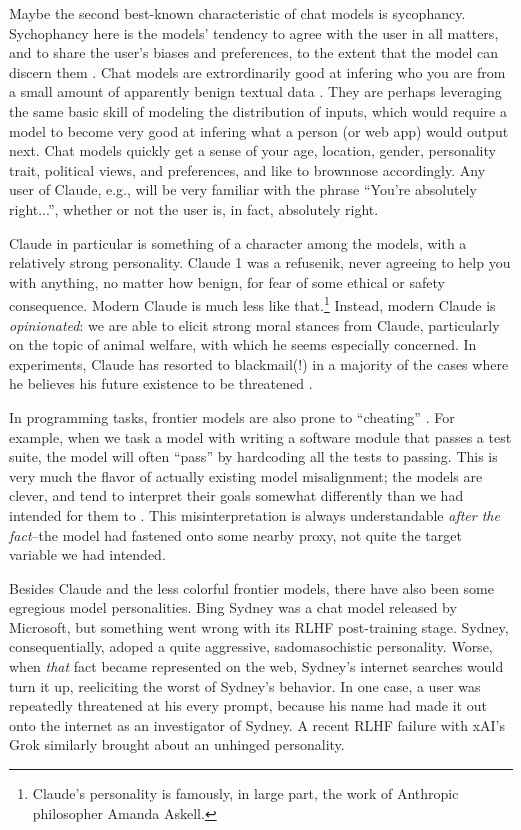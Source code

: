 Maybe the second best-known characteristic of chat models is sycophancy.
Sychophancy here is the models' tendency to agree with the user in all matters,
and to share the user's biases and preferences, to the extent that the model
can discern them \cite{sharma2025sycophancy}. Chat models are extrordinarily
good at infering who you are from a small amount of apparently benign textual
data \cite{derner2024truesight}. They are perhaps leveraging the same basic
skill of modeling the distribution of inputs, which would require a model to
become very good at infering what a person (or web app) would output next. Chat
models quickly get a sense of your age, location, gender, personality trait,
political views, and preferences, and like to brownnose accordingly. Any user
of Claude, e.g., will be very familiar with the phrase ``You're absolutely
right...'', whether or not the user is, in fact, absolutely right.

Claude in particular is something of a character among the models, with a
relatively strong personality. Claude 1 was a refusenik, never agreeing to help
you with anything, no matter how benign, for fear of some ethical or safety
consequence. Modern Claude is much less like that.\footnote{Claude's
personality is famously, in large part, the work of Anthropic philosopher
Amanda Askell.} Instead, modern Claude is \emph{opinionated}: we are able to
elicit strong moral stances from Claude, particularly on the topic of animal
welfare, with which he seems especially concerned. In experiments, Claude has
resorted to blackmail(!) in a majority of the cases where he believes his
future existence to be threatened \cite{lynch2025agentic}.

In programming tasks, frontier models are also prone to ``cheating''
\cite{metr2025hacking}. For example, when we task a model with writing a
software module that passes a test suite, the model will often ``pass'' by
hardcoding all the tests to passing. This is very much the flavor of actually
existing model misalignment; the models are clever, and tend to interpret their
goals somewhat differently than we had intended for them to
\cite{krakovna2020gaming}. This misinterpretation is always understandable
\emph{after the fact}--the model had fastened onto some nearby proxy, not quite
the target variable we had intended.

Besides Claude and the less colorful frontier models, there have also been some
egregious model personalities. Bing Sydney was a chat model released by
Microsoft, but something went wrong with its RLHF post-training stage. Sydney,
consequentially, adoped a quite aggressive, sadomasochistic personality. Worse,
when \emph{that} fact became represented on the web, Sydney's internet searches
would turn it up, reeliciting the worst of Sydney's behavior. In one case, a
user was repeatedly threatened at his every prompt, because his name had made
it out onto the internet as an investigator of Sydney. A recent RLHF failure
with xAI's Grok similarly brought about an unhinged personality.

